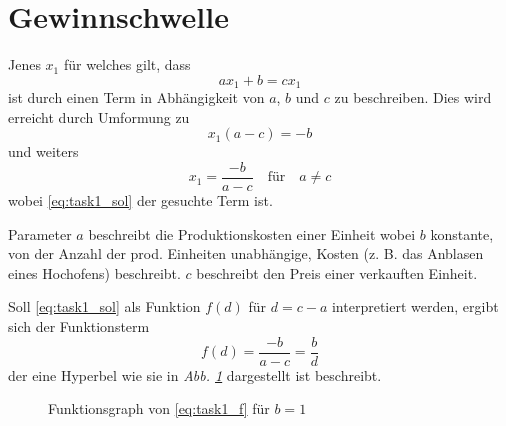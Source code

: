 \documentclass[a4paper]{article}
\newcommand{\figref}[1]{\emph{Abb. \ref{#1}}}
\begin{document}
\section{Gewinnschwelle}

\begin{tasks}
    \item Jenes $x_1$ für welches gilt, dass
    \begin{equation*}
        ax_1 + b = cx_1
    \end{equation*}
    ist durch einen Term in Abhängigkeit von $a$, $b$ und $c$ zu beschreiben. Dies wird erreicht durch Umformung zu
    \begin{equation*}
        x_1(a - c) = -b
    \end{equation*}
    und weiters
    \begin{equation}\label{eq:task1_sol}
        x_1 = \frac{-b}{a - c} \quad\text{für}\quad a \neq c
    \end{equation}
    wobei \eqref{eq:task1_sol} der gesuchte Term ist.

    \item Parameter $a$ beschreibt die Produktionskosten einer Einheit wobei $b$ konstante, von der Anzahl der prod. Einheiten unabhängige, Kosten (z. B. das Anblasen eines Hochofens) beschreibt. $c$ beschreibt den Preis einer verkauften Einheit.

    Soll \eqref{eq:task1_sol} als Funktion $f(d)$ für $d = c - a$ interpretiert werden, ergibt sich der Funktionsterm
    \begin{equation}\label{eq:task1_f}
        f(d) = \frac{-b}{a - c} = \frac{b}{d}
    \end{equation}
    der eine Hyperbel wie sie in \figref{fig:task1_f} dargestellt ist beschreibt.

    \begin{figure}[!h]
        \centering
        \caption{Funktionsgraph von \eqref{eq:task1_f} für $b = 1$}
        \label{fig:task1_f}
    \end{figure}
\end{tasks}
\end{document}
